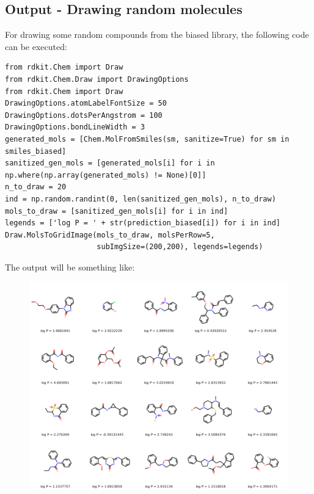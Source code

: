 \documentclass[a4paper]{article}
\begin{document}
\subsection{Output - Drawing random molecules}\label{sec:Output - Drawing random molecules}

For drawing some random compounds from the biased library, the following code can be executed:

\begin{lstlisting}
from rdkit.Chem import Draw
from rdkit.Chem.Draw import DrawingOptions
from rdkit.Chem import Draw
DrawingOptions.atomLabelFontSize = 50
DrawingOptions.dotsPerAngstrom = 100
DrawingOptions.bondLineWidth = 3
generated_mols = [Chem.MolFromSmiles(sm, sanitize=True) for sm in smiles_biased]
sanitized_gen_mols = [generated_mols[i] for i in np.where(np.array(generated_mols) != None)[0]]
n_to_draw = 20
ind = np.random.randint(0, len(sanitized_gen_mols), n_to_draw)
mols_to_draw = [sanitized_gen_mols[i] for i in ind]
legends = ['log P = ' + str(prediction_biased[i]) for i in ind]
Draw.MolsToGridImage(mols_to_draw, molsPerRow=5, 
                     subImgSize=(200,200), legends=legends)
\end{lstlisting}

The output will be something like:

\begin{figure}[htbp]
    \centering
        \includegraphics[width=\textwidth]{output.png}
    \label{fig:output}
\end{figure}
\end{document}
